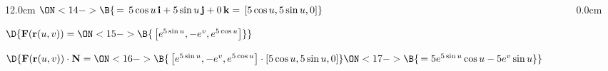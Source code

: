 \begin{frame}
\begin{columns}
\begin{column}{12.0cm}
\hspace{3.65cm} $\ON<14->{\B{\, = \, 5\cos u \,{\bf i} + 5\sin u\,{\bf j} + 0\,{\bf k} = \, [5\cos u,5\sin u,0]}}$

\vspace{0.4cm}

$\D{{\bf F}({\bf r}(u,v)) = 
\ON<15->{\B{\,\left[e^{5\sin u}, -e^{v}, e^{5\cos u}\right]}}}$

\vspace{0.3cm}

$\D{{\bf F}({\bf r}(u,v)) \cdot {\bf N} = 
\ON<16->{\B{\,\left[e^{5\sin u}, -e^{v}, e^{5\cos u}\right] \cdot [5\cos u,5\sin u,0]}}
\ON<17->{\B{\, = 5e^{5\sin u}\cos u - 5e^v\sin u}}}$

\vspace{2.8cm}

	
\end{column}\begin{column}{0.0cm}\end{column}\end{columns}
\end{frame}

